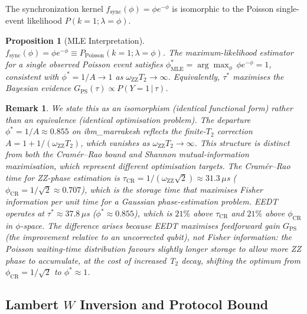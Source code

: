 \documentclass[10pt,twocolumn]{article}
\newtheorem{proposition}{Proposition}
\newtheorem{remark}{Remark}
\newcommand{\GPS}{G_{\mathrm{PS}}}
\newcommand{\oZZ}{\omega_{\mathrm{ZZ}}}
\newcommand{\taustar}{\tau^*}
\begin{document}
The synchronization kernel $f_\mathrm{sync}(\phi)=\phi e^{-\phi}$ is
isomorphic to the Poisson single-event likelihood
$P(k{=}1;\lambda{=}\phi)$.

\begin{proposition}[MLE Interpretation]
\label{prop:mle}
$f_\mathrm{sync}(\phi)=\phi e^{-\phi}\equiv P_{\mathrm{Poisson}}(k{=}1;\lambda{=}\phi)$.
The maximum-likelihood estimator for a single observed Poisson event satisfies
$\phi_\mathrm{MLE}^*=\arg\max_\phi\,\phi e^{-\phi}=1$,
consistent with $\phi^*=1/A\to 1$ as $\oZZ T_2\to\infty$.
Equivalently, $\taustar$ maximises the Bayesian evidence
$G_\mathrm{PS}(\tau)\propto P(Y{=}1\,|\,\tau)$.
\end{proposition}

\begin{remark}
We state this as an \emph{isomorphism} (identical functional form)
rather than an equivalence (identical optimisation problem).
The departure $\phi^*=1/A\approx0.855$ on ibm\_marrakesh reflects the
finite-$T_2$ correction $A=1+1/(\oZZ T_2)$, which vanishes as
$\oZZ T_2\to\infty$.
This structure is distinct from both the Cram\'{e}r--Rao bound
and Shannon mutual-information
maximisation, which represent different optimisation targets.
The Cram\'{e}r--Rao time for ZZ-phase estimation is
$\tau_\mathrm{CR} = 1/(\oZZ\sqrt{2}) \approx 31.3\,\mu$s
($\phi_\mathrm{CR} = 1/\sqrt{2} \approx 0.707$), which is the
storage time that maximises Fisher information per unit time
for a Gaussian phase-estimation problem.
EEDT operates at $\taustar \approx 37.8\,\mu$s
($\phi^* \approx 0.855$), which is $21\%$ above $\tau_\mathrm{CR}$
and $21\%$ above $\phi_\mathrm{CR}$ in $\phi$-space.
The difference arises because EEDT maximises feedforward \emph{gain}
$\GPS$ (the improvement relative to an uncorrected qubit), not
Fisher information: the Poisson waiting-time distribution favours
slightly longer storage to allow more ZZ phase to accumulate,
at the cost of increased T$_2$ decay, shifting the optimum from
$\phi_\mathrm{CR}=1/\sqrt{2}$ to $\phi^*\approx1$.
\end{remark}

\subsection{Lambert \texorpdfstring{$W$}{W} Inversion and Protocol Bound}
\label{subsec:lambertw}
\end{document}
